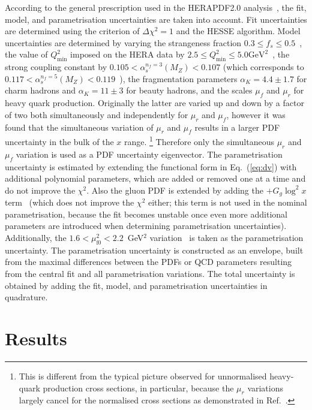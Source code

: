 \documentclass[12pt]{article}
\begin{document}
According to the general prescription used in the HERAPDF2.0 analysis~\cite{Abramowicz:2015mha}, 
the fit, model, and parametrisation uncertainties are taken into account.
Fit uncertainties are determined using the criterion of $\Delta\chi^2 = 1$ and the HESSE algorithm.
Model uncertainties are determined by varying the strangeness fraction $0.3 \leq f_{s} \leq 0.5$~\cite{Abramowicz:2015mha}, the value of $Q^2_{\text{min}}$ imposed on the HERA data by $2.5 \leq Q^2_\textrm{min}\leq 5.0\textrm{GeV}^2$~\cite{Abramowicz:2015mha}, the strong coupling constant by $0.105 < \alpha_s^{n_f=3}(M_Z) < 0.107$ (which corresponds to $0.117 < \alpha_s^{n_f=5}(M_Z) < 0.119$~\cite{Tanabashi:2018oca}), the fragmentation parameters $\alpha_K = 4.4 \pm 1.7$ for charm hadrons and $\alpha_K = 11 \pm 3$ for beauty hadrons, and the scales $\mu_f$ and $\mu_r$ for heavy quark production.
Originally the latter are varied up and down by a factor of two both simultaneously and independently for $\mu_r$ and $\mu_f$, however it was found that the simultaneous variation of $\mu_r$ and $\mu_f$ results in a larger PDF uncertainty in the bulk of the $x$ range.%
\footnote{This is different from the typical picture observed for unnormalised heavy-quark production cross sections, in particular, because the $\mu_r$ variations largely cancel for the normalised cross sections as demonstrated in Ref.~\cite{Zenaiev:2015rfa}.}
Therefore only the simultaneous $\mu_r$ and $\mu_f$ variation is used as a PDF uncertainty eigenvector.
The parametrisation uncertainty is estimated by extending the functional form in Eq.~(\ref{eq:dv}) with additional polynomial parameters, which are added or removed one at a time and do not improve the $\chi^2$. 
Also the gluon PDF is extended by adding the $+G_g\log^2 x$ term~\cite{Bonvini:2019wxf} (which does not improve the $\chi^2$ either; this term is not used in the nominal parametrisation, because the fit becomes unstable once even more additional parameters are introduced when determining parametrisation uncertainties).
Additionally, the $1.6 < \mu_\mathrm{f0}^2 < 2.2$~GeV$^2$ variation~\cite{Abramowicz:2015mha} is taken as the parametrisation uncertainty.
The parametrisation uncertainty is constructed as an envelope, built from the maximal differences between the PDFs or QCD parameters resulting from the central fit and all parametrisation variations.
The total uncertainty is obtained by adding the fit, model, and parametrisation uncertainties in quadrature.

\section{Results}
\label{sec:results}
\end{document}
